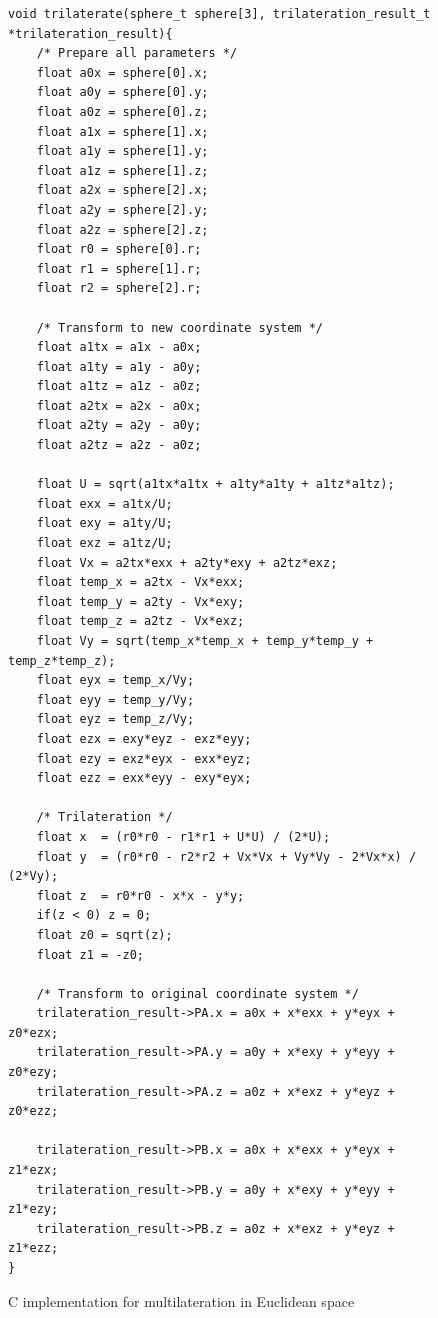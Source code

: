 \documentclass[\main/thesis.tex]{subfiles}
\begin{document}
\begin{figure}[H]
    \begin{lstlisting}[style=CStyle]
void trilaterate(sphere_t sphere[3], trilateration_result_t *trilateration_result){
    /* Prepare all parameters */
    float a0x = sphere[0].x;
    float a0y = sphere[0].y;
    float a0z = sphere[0].z;
    float a1x = sphere[1].x;
    float a1y = sphere[1].y;
    float a1z = sphere[1].z;
    float a2x = sphere[2].x;
    float a2y = sphere[2].y;
    float a2z = sphere[2].z;
    float r0 = sphere[0].r;
    float r1 = sphere[1].r;
    float r2 = sphere[2].r;

    /* Transform to new coordinate system */
    float a1tx = a1x - a0x;
    float a1ty = a1y - a0y;
    float a1tz = a1z - a0z;
    float a2tx = a2x - a0x;
    float a2ty = a2y - a0y;
    float a2tz = a2z - a0z;
    
    float U = sqrt(a1tx*a1tx + a1ty*a1ty + a1tz*a1tz);
    float exx = a1tx/U;
    float exy = a1ty/U;
    float exz = a1tz/U;
    float Vx = a2tx*exx + a2ty*exy + a2tz*exz;
    float temp_x = a2tx - Vx*exx;
    float temp_y = a2ty - Vx*exy;
    float temp_z = a2tz - Vx*exz;
    float Vy = sqrt(temp_x*temp_x + temp_y*temp_y + temp_z*temp_z);
    float eyx = temp_x/Vy;
    float eyy = temp_y/Vy;
    float eyz = temp_z/Vy;
    float ezx = exy*eyz - exz*eyy;
    float ezy = exz*eyx - exx*eyz;
    float ezz = exx*eyy - exy*eyx;

    /* Trilateration */
    float x  = (r0*r0 - r1*r1 + U*U) / (2*U);
    float y  = (r0*r0 - r2*r2 + Vx*Vx + Vy*Vy - 2*Vx*x) / (2*Vy);
    float z  = r0*r0 - x*x - y*y;
    if(z < 0) z = 0;
    float z0 = sqrt(z);
    float z1 = -z0;

    /* Transform to original coordinate system */
    trilateration_result->PA.x = a0x + x*exx + y*eyx + z0*ezx;
    trilateration_result->PA.y = a0y + x*exy + y*eyy + z0*ezy;
    trilateration_result->PA.z = a0z + x*exz + y*eyz + z0*ezz;

    trilateration_result->PB.x = a0x + x*exx + y*eyx + z1*ezx;
    trilateration_result->PB.y = a0y + x*exy + y*eyy + z1*ezy;
    trilateration_result->PB.z = a0z + x*exz + y*eyz + z1*ezz;
}
    \end{lstlisting}
    \caption{C implementation for multilateration in Euclidean space}
    \label{fig:multilateration_c_implementation}
\end{figure}
\end{document}
